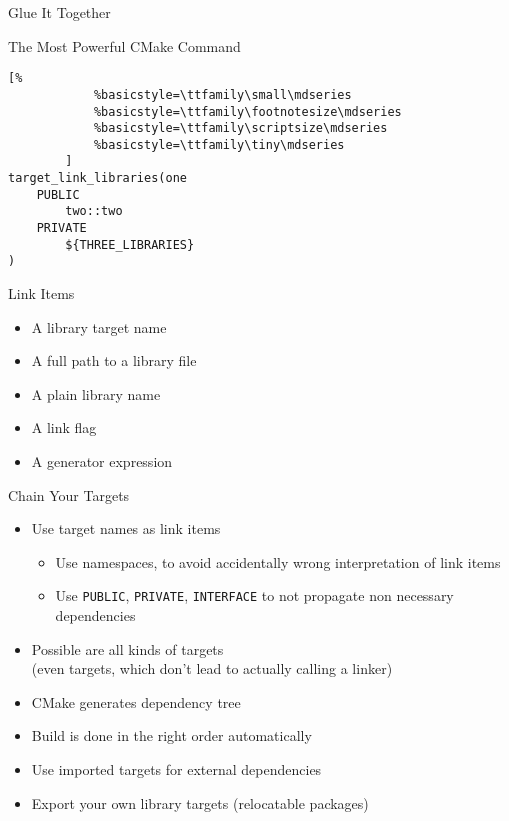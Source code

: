 \documentclass[t]{beamer}
\begin{document}
\begin{frame}[fragile]{Glue It Together}
    \begin{alertblock}{The Most Powerful CMake Command}
        \begin{lstlisting}[%
            %basicstyle=\ttfamily\small\mdseries
            %basicstyle=\ttfamily\footnotesize\mdseries
            %basicstyle=\ttfamily\scriptsize\mdseries
            %basicstyle=\ttfamily\tiny\mdseries
        ]
target_link_libraries(one
    PUBLIC
        two::two
    PRIVATE
        ${THREE_LIBRARIES}
)
        \end{lstlisting}
    \end{alertblock}

    \pause

    \begin{block}{Link Items}
        \begin{itemize}
            \item \alert{A library target name}
            \item A full path to a library file
            \item A plain library name
            \item A link flag
            \item A generator expression
        \end{itemize}
    \end{block}
\end{frame}

\begin{frame}{Chain Your Targets}
    \begin{itemize}
        \item Use target names as link items
            \begin{itemize}
                \item Use namespaces, to avoid accidentally wrong
                    interpretation of link items
                \item Use \texttt{PUBLIC}, \texttt{PRIVATE},
                    \texttt{INTERFACE} to not propagate non necessary
                    dependencies
            \end{itemize}
        \item Possible are all kinds of targets\\(even targets, which
            don't lead to actually calling a linker)
        \item CMake generates dependency tree
        \item Build is done in the right order automatically
        \item Use imported targets for external dependencies
        \item Export your own library targets (relocatable packages)
    \end{itemize}
\end{frame}
\end{document}
